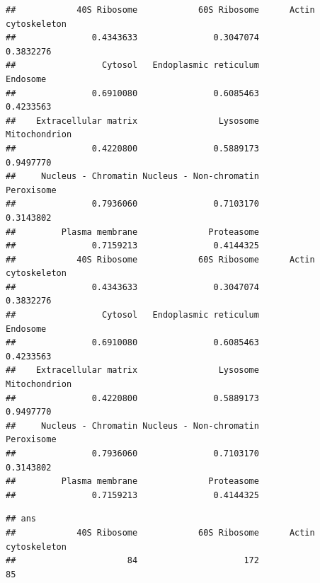 \begin{knitrout}
\color{fgcolor}\begin{kframe}
\begin{alltt}
 \hlkwb{<-}   \hlstd{=} \hlstd{,}  \hlstd{=} \hlstd{,}  \hlstd{=} \hlstd{,}  \hlstd{=} \hlstd{))}
\end{alltt}
\begin{verbatim}
##            40S Ribosome            60S Ribosome      Actin cytoskeleton 
##               0.4343633               0.3047074               0.3832276 
##                 Cytosol   Endoplasmic reticulum                Endosome 
##               0.6910080               0.6085463               0.4233563 
##    Extracellular matrix                Lysosome           Mitochondrion 
##               0.4220800               0.5889173               0.9497770 
##     Nucleus - Chromatin Nucleus - Non-chromatin              Peroxisome 
##               0.7936060               0.7103170               0.3143802 
##         Plasma membrane              Proteasome 
##               0.7159213               0.4144325
##            40S Ribosome            60S Ribosome      Actin cytoskeleton 
##               0.4343633               0.3047074               0.3832276 
##                 Cytosol   Endoplasmic reticulum                Endosome 
##               0.6910080               0.6085463               0.4233563 
##    Extracellular matrix                Lysosome           Mitochondrion 
##               0.4220800               0.5889173               0.9497770 
##     Nucleus - Chromatin Nucleus - Non-chromatin              Peroxisome 
##               0.7936060               0.7103170               0.3143802 
##         Plasma membrane              Proteasome 
##               0.7159213               0.4144325
\end{verbatim}
\begin{alltt}
 \hlkwb{<-}   \hlstd{=} \hlstd{,}  \hlstd{=} \hlstd{,}  \hlstd{=} \hlstd{,}  
\end{alltt}
\begin{verbatim}
## ans
##            40S Ribosome            60S Ribosome      Actin cytoskeleton 
##                      84                     172                      85 

\end{verbatim}
\end{kframe}
\end{knitrout}
